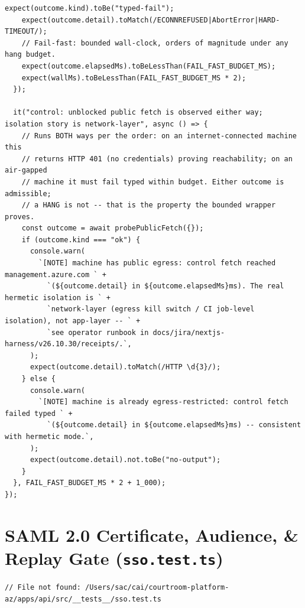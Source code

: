 \documentclass[10pt,twoside,openany]{book}
\theoremstyle{plain}
\theoremstyle{definition}
\theoremstyle{remark}
\begin{document}
\begin{lstlisting}[caption={apps/web/test/harness/nfr/hermetic.test.ts}]
    expect(outcome.kind).toBe("typed-fail");
    expect(outcome.detail).toMatch(/ECONNREFUSED|AbortError|HARD-TIMEOUT/);
    // Fail-fast: bounded wall-clock, orders of magnitude under any hang budget.
    expect(outcome.elapsedMs).toBeLessThan(FAIL_FAST_BUDGET_MS);
    expect(wallMs).toBeLessThan(FAIL_FAST_BUDGET_MS * 2);
  });

  it("control: unblocked public fetch is observed either way; isolation story is network-layer", async () => {
    // Runs BOTH ways per the order: on an internet-connected machine this
    // returns HTTP 401 (no credentials) proving reachability; on an air-gapped
    // machine it must fail typed within budget. Either outcome is admissible;
    // a HANG is not -- that is the property the bounded wrapper proves.
    const outcome = await probePublicFetch({});
    if (outcome.kind === "ok") {
      console.warn(
        `[NOTE] machine has public egress: control fetch reached management.azure.com ` +
          `(${outcome.detail} in ${outcome.elapsedMs}ms). The real hermetic isolation is ` +
          `network-layer (egress kill switch / CI job-level isolation), not app-layer -- ` +
          `see operator runbook in docs/jira/nextjs-harness/v26.10.30/receipts/.`,
      );
      expect(outcome.detail).toMatch(/HTTP \d{3}/);
    } else {
      console.warn(
        `[NOTE] machine is already egress-restricted: control fetch failed typed ` +
          `(${outcome.detail} in ${outcome.elapsedMs}ms) -- consistent with hermetic mode.`,
      );
      expect(outcome.detail).not.toBe("no-output");
    }
  }, FAIL_FAST_BUDGET_MS * 2 + 1_000);
});

\end{lstlisting}

\section{SAML 2.0 Certificate, Audience, \& Replay Gate (\texttt{sso.test.ts})}
\begin{lstlisting}[caption={apps/api/src/\_\_tests\_\_/sso.test.ts}]
// File not found: /Users/sac/cai/courtroom-platform-az/apps/api/src/__tests__/sso.test.ts
\end{lstlisting}

\backmatter
\end{document}
